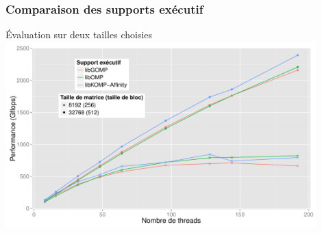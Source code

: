 \documentclass[xcolor={usenames,dvipsnames,svgnames,table}, aspectratio=43]{beamer}
\begin{document}
\begin{frame}
  \frametitle{Comparaison des supports exécutif}
  Évaluation sur deux tailles choisies
  \includegraphics[width=0.9\textwidth]{graph/graph_all_cholesky_idchire.pdf}
\end{frame}
\end{document}

